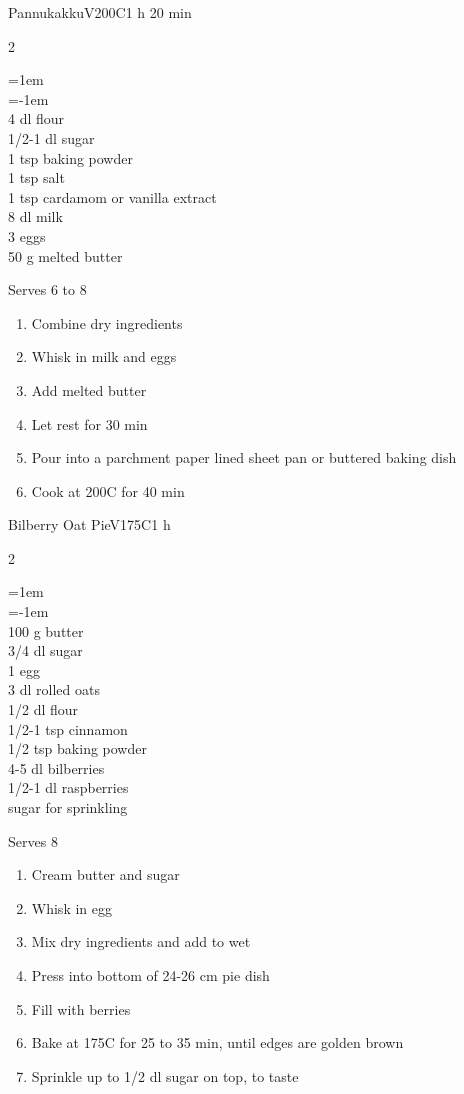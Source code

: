 \documentclass{article}
\newenvironment{recipe}[3][]
    {\begin{cardbase}[#1]{#2}{#3}
    \columnratio{0.333}
    \begin{paracol}{2}}
    {\end{paracol}\end{cardbase}}
\newenvironment{denserecipe}[3][]
    {\small
    \begin{recipe}[#1]{#2}{#3}}
    {\end{recipe}}
\newcommand{\nextcolumn}{\switchcolumn}
\newenvironment{ingredients}
    {
    \begin{obeylines}
    \vspace{\parskip}
    \setlength{\parskip}{0.25em}
    \vspace{-0.25em}
    \leftskip=1em
    \parindent=-1em}
    {\end{obeylines}}
\newenvironment{steps}
    {\begin{enumerate}[leftmargin=*,topsep=0pt]}
    {\end{enumerate}}
\newcommand{\celsius}[1]{#1\textdegree{}C}
\newcommand{\tag}[1]{\hspace{1em}#1}
\newcommand{\symboltag}[2]{\tag{#1\hspace{0.4em}#2}}
\newcommand{\totaltime}[1]{\symboltag{\raisebox{-0.1em}{\small\StopWatchEnd}}{#1}}
\newcommand{\preheat}[1]{\symboltag{\Topbottomheat}{#1}}
\begin{document}
\begin{recipe}{Pannukakku}{\tag{V}\preheat{\celsius{200}}\totaltime{1 h 20 min}}
\begin{ingredients}
4 dl flour
1/2-1 dl sugar
1 tsp baking powder
1 tsp salt
1 tsp cardamom or vanilla extract
8 dl milk
3 eggs
50 g melted butter
\end{ingredients}
\nextcolumn
Serves 6 to 8
\begin{steps}
    \item Combine dry ingredients
    \item Whisk in milk and eggs
    \item Add melted butter
    \item Let rest for 30 min
    \item Pour into a parchment paper lined sheet pan or buttered baking dish
    \item Cook at \celsius{200} for 40 min
\end{steps}
\end{recipe}

\begin{denserecipe}{Bilberry Oat Pie}{\tag{V}\preheat{\celsius{175}}\totaltime{1 h}}
\begin{ingredients}
100 g butter
3/4 dl sugar
1 egg
3 dl rolled oats
1/2 dl flour
1/2-1 tsp cinnamon
1/2 tsp baking powder
4-5 dl bilberries
1/2-1 dl raspberries
sugar for sprinkling
\end{ingredients}
\nextcolumn
Serves 8
\begin{steps}
    \item Cream butter and sugar
    \item Whisk in egg
    \item Mix dry ingredients and add to wet
    \item Press into bottom of 24-26 cm pie dish
    \item Fill with berries
    \item Bake at \celsius{175} for 25 to 35 min, until edges are golden brown
    \item Sprinkle up to 1/2 dl sugar on top, to taste
\end{steps}
\end{denserecipe}
\end{document}
